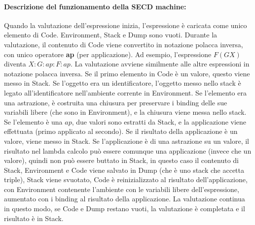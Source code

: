 \documentclass{article}
\begin{document}
\paragraph{Descrizione del funzionamento della SECD machine:}
Quando la valutazione dell'espressione inizia, l'espressione è caricata come unico elemento di Code. Environment, Stack e Dump sono vuoti.
Durante la valutazione, il contenuto di Code viene convertito in notazione polacca inversa, con unico operatore \textbf{ap} (per applicazione).
Ad esempio, l'espressione $F ( G X )$ diventa $X:G:ap:F:ap$.
La valutazione avviene similmente alle altre espressioni in notazione polacca inversa.
Se il primo elemento in Code è un valore, questo viene messo in Stack. Se l'oggetto era un identificatore, l'oggetto messo nello stack è legato all'identificatore nell'ambiente corrente in Environment. Se l'elemento era una astrazione, è costruita una chiusura per preservare i binding delle sue variabili libere (che sono in Environment), e la chiusura viene messa nello stack.
Se l'elemento è una $ap$, due valori sono estratti da Stack, e la applicazione viene effettuata (primo applicato al secondo). Se il risultato della applicazione è un valore, viene messo in Stack.
Se l'applicazione è di una astrazione su un valore, il risultato nel lambda calcolo può essere comunque una applicazione (invece che un valore), quindi non può essere buttato in Stack, in questo caso il contenuto di Stack, Environment e Code viene salvato in Dump (che è uno stack che accetta triple), Stack viene svuotato, Code è reinizializzato al risultato dell'applicazione, con Environment contenente l'ambiente con le variabili libere dell'espressione, aumentato con i binding al risultato della applicazione.
La valutazione continua in questo modo, se Code e Dump restano vuoti, la valutazione è completata e il risultato è in Stack.


%

%

%

%


\printbibliography
\end{document}
